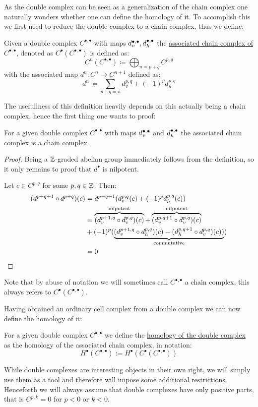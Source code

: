 As the double complex can be seen as a generalization of the chain complex one
naturally wonders whether one can define the homology of it.
To accomplish this we first need to reduce the double complex to a chain 
complex, thus we define:
\begin{definition}
	Given a double complex $C^{\bullet, \bullet}$ with maps $d^{\bullet, \bullet}_v, d^{\bullet, \bullet}_h$ the
	\underline{associated chain complex of $C^{\bullet, \bullet}$}, denoted as
	$C^\bullet(C^{\bullet, \bullet})$ is defined as:
	\[
		C^n(C^{\bullet, \bullet}) \coloneq \bigoplus_{n = p + q} C^{p,q}
	\]
	with the associated map $d^n: C^n \to C^{n + 1}$
	defined as:
	\[
		d^n \coloneq \sum_{p + q = n} d^{p,q}_v + (-1)^p d^{p,q}_h
	\]
\end{definition}
The usefullness of this definition heavily depends on this actually being a
chain complex, hence the first thing one wants to proof:
\begin{lemma}
	For a given double complex $C^{\bullet, \bullet}$ with maps $d^{\bullet, \bullet}_v$ and $d^{\bullet, \bullet}_h$
	the associated chain complex is a chain complex.
\end{lemma}
\begin{proof}
	Being a $\mathbb{Z}$-graded abelian group immediately follows from the definition,
	so it only remains to proof that $d^\bullet$ is nilpotent.

	Let $c \in C^{p,q}$ for some $p,q \in \mathbb{Z}$. Then:
	\begin{align*}
		(d^{p + q + 1} \circ d^{p + q})(c)
		&=
		d^{p + q + 1}(d^{p,q}_v(c) + (-1)^p d^{p,q}_h(c)) \\
		&=
		\overbrace{
			(d^{p + 1, q}_v \circ d^{p,q}_v)(c)
		}^{\text{nilpotent}}
		+
		\overbrace{
			(d^{p, q + 1}_v \circ d^{p,q}_v)(c)
		}^{\text{nilpotent}} \\
		&+ (-1)^p (\underbrace{
				(d^{p + 1, q}_v \circ d^{p,q}_h)(c)
				- (d^{p, q + 1}_h \circ d^{p,q}_v)(c)
			)
		}_{\text{commutative}}) \\
		&= 0 \qedhere
	\end{align*}
\end{proof}
Note that by abuse of notation we will sometimes call $C^{\bullet, \bullet}$
a chain complex, this always refers to $C^\bullet(C^{\bullet,\bullet})$.

Having obtained an ordinary cell complex from a double complex we can
now define the homology of it:
\begin{definition}
	For a given double complex $C^{\bullet,\bullet}$ we define the
	\underline{homology of the double complex} as the homology of the
	associated chain complex, in notation:
	\[
		H^\bullet(C^{\bullet,\bullet}) := H^\bullet(C^\bullet(C^{\bullet,\bullet}))
	\]
\end{definition}
While double complexes are interesting objects in their own right, we
will simply use them as a tool and therefore will impose some additional
restrictions. Henceforth we will always assume that double complexes have
only positive parts, that is $C^{p,k} = 0$ for $p < 0$ or $k <0$.

